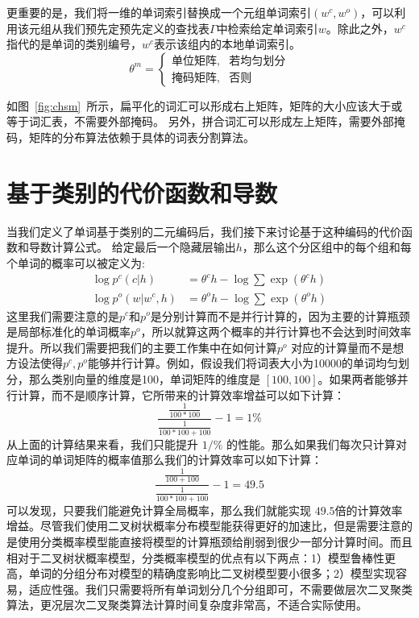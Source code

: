 更重要的是，我们将一维的单词索引替换成一个元组单词索引$(w ^ c,w ^ o)$，可以利用该元组从我们预先定预先定义的查找表$\Gamma $中检索给定单词索引$ w $。除此之外，$ w ^ c $指代的是单词的类别编号，$ w^c $表示该组内的本地单词索引。
\begin{equation}\label{equ:partition}
 \theta^m=
\begin{cases}
    \text{单位矩阵} ,& \text{若均匀划分} \\
    \text{掩码矩阵},   & \text{否则}
\end{cases}
\end{equation}


如图~\ref{fig:chsm}~所示，扁平化的词汇可以形成右上矩阵，矩阵的大小应该大于或等于词汇表，不需要外部掩码。
另外，拼合词汇可以形成左上矩阵，需要外部掩码，矩阵的分布算法依赖于具体的词表分割算法。

\section{基于类别的代价函数和导数}
当我们定义了单词基于类别的二元编码后，我们接下来讨论基于这种编码的代价函数和导数计算公式。
给定最后一个隐藏层输出$ h $，那么这个分区组中的每个组和每个单词的概率可以被定义为:
\begin{equation}
\begin{split}
\log p^c(c|h) &= \theta^c h-\log \sum{\exp( \theta^c h )} \\
\log p^o(w|w^c,h)&=\theta^o h -\log\sum\exp{(\theta^o h)}
\end{split}
\end{equation}
这里我们需要注意的是$ p ^ c $和$ p ^o $是分别计算而不是并行计算的，因为主要的计算瓶颈是局部标准化的单词概率$ p ^ o $，所以就算这两个概率的并行计算也不会达到时间效率提升。所以我们需要把我们的主要工作集中在如何计算$p^o$ 对应的计算量而不是想方设法使得$p^c,p^o$能够并行计算。例如，假设我们将词表大小为10000的单词均匀划分，那么类别向量的维度是100，单词矩阵的维度是 $[100,100]$。如果两者能够并行计算，而不是顺序计算，它所带来的计算效率增益可以如下计算：
\begin{equation}\label{equ:example}
  \frac{\frac{1}{100*100}}{\frac{1}{100*100+100}}-1=1\%
\end{equation}
从上面的计算结果来看，我们只能提升 $1/\%$ 的性能。那么如果我们每次只计算对应单词的单词矩阵的概率值那么我们的计算效率可以如下计算：
\begin{equation}\label{equ:example2}
  \frac{\frac{1}{100+100}}{\frac{1}{100*100+100}}-1=49.5
\end{equation}
可以发现，只要我们能避免计算全局概率，那么我们就能实现 $49.5$倍的计算效率增益。尽管我们使用二叉树状概率分布模型能获得更好的加速比，但是需要注意的是使用分类概率模型能直接将模型的计算瓶颈给削弱到很少一部分计算时间。而且相对于二叉树状概率模型，分类概率模型的优点有以下两点：1）模型鲁棒性更高，单词的分组分布对模型的精确度影响比二叉树模型要小很多；2）模型实现容易，适应性强。我们只需要将所有单词划分几个分组即可，不需要做层次二叉聚类算法，更况层次二叉聚类算法计算时间复杂度非常高，不适合实际使用。


